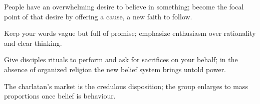 

\begin{distilled}
  \item People have an overwhelming desire to believe in something; become the focal point of that desire by offering a cause, a new faith to follow.
  \item Keep your words vague but full of promise; emphasize enthusiasm over rationality and clear thinking.
  \item Give disciples rituals to perform and ask for sacrifices on your behalf; in the absence of organized religion the new belief system brings untold power.
  \item The charlatan's market is the credulous disposition; the group enlarges to mass proportions once belief is behaviour.
\end{distilled}
